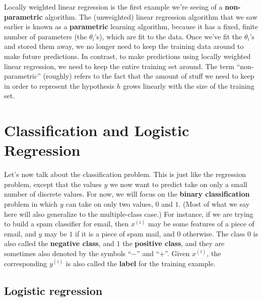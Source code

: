 Locally weighted linear regression is the first example we're seeing of a
\textbf{non-parametric} algorithm. The (unweighted) linear regression algorithm
that we saw earlier is known as a \textbf{parametric} learning algorithm, because
it has a fixed, finite number of parameters (the $\theta_i$'s), which are fit to the
data. Once we've fit the $\theta_i$'s and stored them away, we no longer need to
keep the training data around to make future predictions. In contrast, to
make predictions using locally weighted linear regression, we need to keep
the entire training set around. The term ``non-parametric'' (roughly) refers
to the fact that the amount of stuff we need to keep in order to represent the
hypothesis $h$ grows linearly with the size of the training set.



\chapter{Classification and Logistic Regression}
\label{cha:classification_logistic_regression}

Let's now talk about the classification problem. This is just like the regression
problem, except that the values $y$ we now want to predict take on only
a small number of discrete values. For now, we will focus on the \textbf{binary
classification} problem in which $y$ can take on only two values, $0$ and $1$.
(Most of what we say here will also generalize to the multiple-class case.)
For instance, if we are trying to build a spam classifier for email, then $x^{(i)}$
may be some features of a piece of email, and $y$ may be $1$ if it is a piece
of spam mail, and $0$ otherwise. The class $0$ is also called the \textbf{negative class}, and $1$ %
the \textbf{positive class}, and they are sometimes also denoted by the symbols ``$-$''
and ``$+$''. Given $x^{(i)}$, the corresponding $y^{(i)}$ is also called the \textbf{label} for the
training example.

\section{Logistic regression} %

\titlespacing*{\part}{0pt}{50pt}{40pt} %
\titlespacing*{\chapter}{0pt}{50pt}{40pt} %

